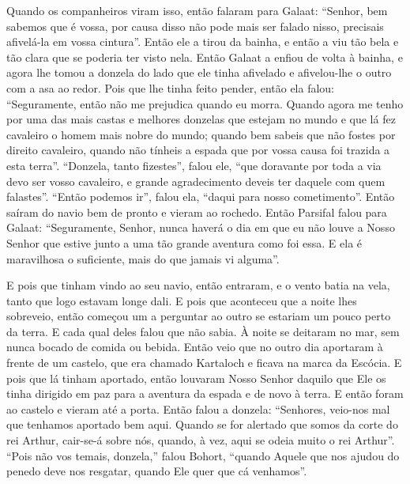 Quando os companheiros viram isso, então falaram para Galaat: “Senhor, bem
sabemos que é vossa, por causa disso não pode mais ser falado nisso, precisais
afivelá-la em vossa cintura”. Então ele a tirou da bainha, e então a viu tão
bela e tão clara que se poderia ter visto nela. Então Galaat a enfiou de volta
à bainha, e agora lhe tomou a donzela do lado que ele tinha afivelado e
afivelou-lhe o outro com a asa ao redor. Pois que lhe tinha feito pender, então
ela falou: “Seguramente, então não me prejudica quando eu morra. Quando agora
me tenho por uma das mais castas e melhores donzelas que estejam no mundo e que
lá fez cavaleiro o homem mais nobre do mundo; quando bem sabeis que não fostes
por direito cavaleiro, quando não tínheis a espada que por vossa causa foi
trazida a esta terra”. “Donzela, tanto fizestes”, falou ele, “que doravante por
toda a via devo ser vosso cavaleiro, e grande agradecimento deveis ter daquele
com quem falastes”. “Então podemos ir”, falou ela, “daqui para nosso
cometimento”. Então saíram do navio bem de pronto e vieram ao rochedo. Então
Parsifal falou para Galaat: “Seguramente, Senhor, nunca haverá o dia em que eu
não louve a Nosso Senhor que estive junto a uma tão grande aventura como foi
essa. E ela é maravilhosa o suficiente, mais do que jamais vi alguma”.

E pois que tinham vindo ao seu navio, então entraram, e o vento batia na vela,
tanto que logo estavam longe dali. E pois que aconteceu que a noite lhes
sobreveio, então começou um a perguntar ao outro se estariam um pouco perto da
terra. E cada qual deles falou que não sabia. À noite se deitaram no mar, sem
nunca bocado de comida ou bebida. Então veio que no outro dia aportaram à
frente de um castelo, que era chamado Kartaloch e ficava na marca da Escócia. E
pois que lá tinham aportado,  então louvaram Nosso Senhor daquilo que Ele os
tinha dirigido em paz para a aventura da espada e de novo à terra. E então
foram ao castelo e vieram até a porta. Então falou a donzela: “Senhores,
veio-nos mal que tenhamos aportado bem aqui. Quando se for alertado que somos
da corte do rei Arthur, cair-se-á sobre nós, quando, à vez, aqui se odeia muito
o rei Arthur”. “Pois não vos temais, donzela,” falou Bohort, “quando Aquele que
nos ajudou do penedo deve nos resgatar, quando Ele quer que cá venhamos”.

